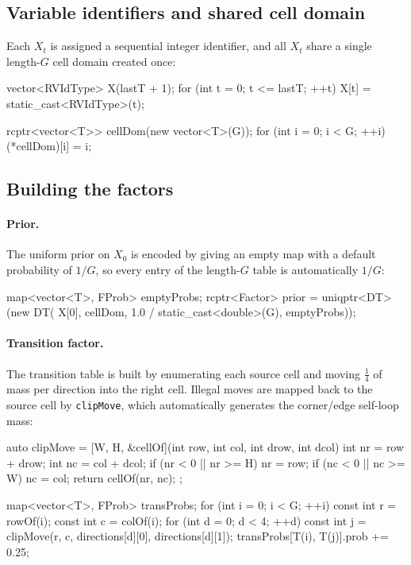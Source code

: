 \documentclass[11pt, a4paper]{article}
\begin{document}
\subsection{Variable identifiers and shared cell domain}

Each $X_t$ is assigned a sequential integer identifier, and all $X_t$ share
a single length-$G$ cell domain created once:

\begin{cppd}
vector<RVIdType> X(lastT + 1);
for (int t = 0; t <= lastT; ++t) X[t] = static_cast<RVIdType>(t);

rcptr<vector<T>> cellDom(new vector<T>(G));
for (int i = 0; i < G; ++i) (*cellDom)[i] = i;
\end{cppd}

\subsection{Building the factors}

\paragraph{Prior.} The uniform prior on $X_0$ is encoded by giving
an empty map with a default probability of $1/G$, so every
entry of the length-$G$ table is automatically $1/G$:

\begin{cppd}
map<vector<T>, FProb> emptyProbs;
rcptr<Factor> prior = uniqptr<DT>(new DT(
    {X[0]}, {cellDom}, 1.0 / static_cast<double>(G), emptyProbs));
\end{cppd}

\paragraph{Transition factor.} The transition table is built by enumerating
each source cell and moving $\tfrac{1}{4}$ of mass per direction into
the right cell. Illegal moves are mapped back to the
source cell by \texttt{clipMove}, which automatically generates the
corner/edge self-loop mass:

\begin{cppd}
auto clipMove =
    [W, H, &cellOf](int row, int col, int drow, int dcol) {
      int nr = row + drow;
      int nc = col + dcol;
      if (nr < 0 || nr >= H) nr = row;
      if (nc < 0 || nc >= W) nc = col;
      return cellOf(nr, nc);
    };

map<vector<T>, FProb> transProbs;
for (int i = 0; i < G; ++i) {
  const int r = rowOf(i);
  const int c = colOf(i);
  for (int d = 0; d < 4; ++d) {
    const int j = clipMove(r, c, directions[d][0], directions[d][1]);
    transProbs[{T(i), T(j)}].prob += 0.25;
  }
}
\end{cppd}
\end{document}
